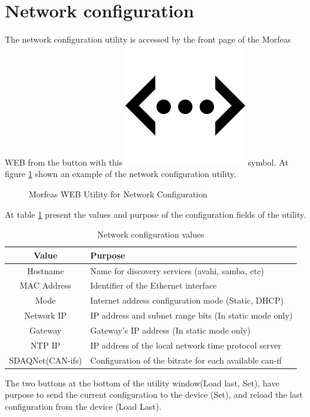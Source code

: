 \section{Network configuration}
The network configuration utility is accessed by the front page of the Morfeas WEB from the button with
this \includegraphics[height=.125in]{../art/eth.png} symbol.
At figure \ref{fig:net_conf} shown an example of the network configuration utility.
\begin{figure}[h]
\centering
	\caption{Morfeas WEB Utility for Network Configuration}
	\label{fig:net_conf}
\end{figure}

At table \ref{tab:net_conf} present the values and purpose of the configuration fields of the utility.
\begin{table}[h!]
	\begin{center}
		\begin{tabular}{|c|l|}
			\hline
			\textbf{Value} & \textbf{Purpose}\\
			\hline
			Hostname & Name for discovery services (avahi, samba, etc)\\
			\hline
			MAC Address & Identifier of the Ethernet interface\\
			\hline
			Mode & Internet address configuration mode (Static, DHCP)\\
			\hline
			Network IP & IP address and subnet range bits (In static mode only)\\
			Gateway & Gateway's IP address (In static mode only)\\
			\hline
			NTP IP & IP address of the local network time protocol server\\
			\hline
			SDAQNet(CAN-ifs) & Configuration of the bitrate for each available can-if\\
			\hline
		\end{tabular}
		\caption{Network configuration values}
		\label{tab:net_conf}
	\end{center}
\end{table}

The two buttons at the bottom of the utility window(Load last, Set),
have purpose to send the current configuration to the device (Set),
and reload the last configuration from the device (Load Last).